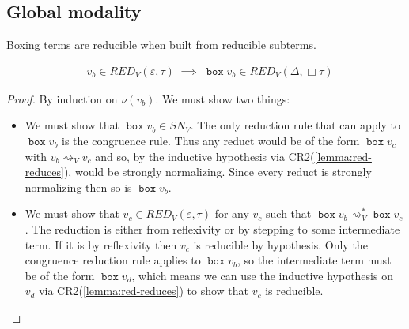 \documentclass[acmsmall, screen, review, anonymous]{acmart}
\theoremstyle{definition}
\newcommand{\glob}{\mathop{\Box}}
\newcommand{\cempty}{\varepsilon}
\newcommand{\gboxname}{\mathop{\mathtt{box}}}
\newcommand{\gbox}[1]{\gboxname #1}
\newcommand{\stepstoname}{\rightsquigarrow}
\newcommand{\stepstov}{\stepstoname_V}
\newcommand{\reducestoname}{\stepstoname^{*}}
\newcommand{\reducestov}{\reducestoname_{V}}
\newcommand{\snv}{SN_V}
\newcommand{\bound}[1]{\nu(#1)}
\newcommand{\redname}{RED}
\newcommand{\redvname}{\redname_{V}}
\newcommand{\redv}[2]{\redvname{({#1},{#2})}}
\begin{document}
\subsection{Global modality}

Boxing terms are reducible when built from reducible subterms.
\begin{lemma}
\label{lemma:red-box}
\begin{align*}
  &v_b \in \redv{\cempty}{\tau} \; \implies \; \gbox{v_b} \in \redv{\Delta}{\glob \tau}
\end{align*}
\end{lemma}
\begin{proof}
  By induction on $\bound{v_b}$. We must show two things:
  \begin{itemize}
  \item We must show that $\gbox{v_b} \in \snv$. The only reduction rule that can apply
    to $\gbox{v_b}$ is the congruence rule. Thus any reduct would be of
    the form $\gbox{v_c}$ with $v_b \stepstov v_c$ and so, by the
    inductive hypothesis via CR2(\ref{lemma:red-reduces}), would be
    strongly normalizing. Since every reduct is strongly normalizing then
    so is $\gbox{v_b}$.
  \item We must show that $v_c \in \redv{\cempty}{\tau}$ for any $v_c$
    such that $\gbox{v_b} \reducestov \gbox{v_c}$. The reduction is
    either from reflexivity or by stepping to some intermediate term. If
    it is by reflexivity then $v_c$ is reducible by hypothesis. Only the
    congruence reduction rule applies to $\gbox{v_b}$, so the
    intermediate term must be of the form $\gbox{v_d}$, which means we
    can use the inductive hypothesis on $v_d$ via
    CR2(\ref{lemma:red-reduces}) to show that $v_c$ is reducible.
  \end{itemize}
\end{proof}
\end{document}
